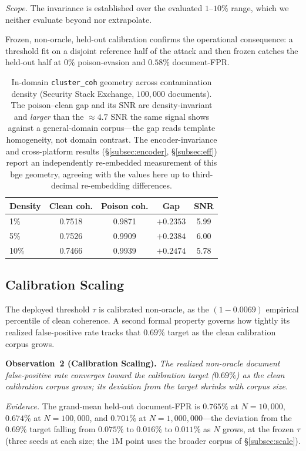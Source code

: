 \documentclass[conference]{IEEEtran}
\begin{document}
\emph{Scope.} The invariance is established over the evaluated $1$--$10\%$ range,
which we neither evaluate beyond nor extrapolate.

Frozen, non-oracle, held-out calibration confirms the operational consequence: a
threshold fit on a disjoint reference half of the attack and then frozen catches the
held-out half at $0\%$ poison-evasion and $0.58\%$ document-FPR.

\begin{table}[t]
\centering
\caption{In-domain \texttt{cluster\_coh} geometry across contamination density
(Security Stack Exchange, $100{,}000$ documents). The poison--clean gap and its
SNR are density-invariant and \emph{larger} than the $\approx\!4.7$ SNR the same
signal shows against a general-domain corpus---the gap reads template homogeneity,
not domain contrast. The encoder-invariance and cross-platform results
(\S\ref{subsec:encoder}, \S\ref{subsec:eff}) report an independently re-embedded measurement of
this bge geometry, agreeing with the values here up to third-decimal re-embedding differences.}
\label{tab:coh}
\begin{tabular}{lcccc}
\toprule
Density & Clean coh. & Poison coh. & Gap & SNR \\
\midrule
1\%  & 0.7518 & 0.9871 & $+0.2353$ & 5.99 \\
5\%  & 0.7526 & 0.9909 & $+0.2384$ & 6.00 \\
10\% & 0.7466 & 0.9939 & $+0.2474$ & 5.78 \\
\bottomrule
\end{tabular}
\end{table}

\subsection{Calibration Scaling}
\label{subsec:calib}
The deployed threshold $\tau$ is calibrated non-oracle, as the $(1-0.0069)$
empirical percentile of clean coherence. A second formal property governs how
tightly its realized false-positive rate tracks that $0.69\%$ target as the clean
calibration corpus grows.

\smallskip
\noindent\textbf{Observation~2 (Calibration Scaling).}
\emph{The realized non-oracle document false-positive rate converges toward the
calibration target ($0.69\%$) as the clean calibration corpus grows; its deviation
from the target shrinks with corpus size.}

\emph{Evidence.} The grand-mean held-out document-FPR is $0.765\%$ at $N=10{,}000$,
$0.674\%$ at $N=100{,}000$, and $0.701\%$ at $N=1{,}000{,}000$---the deviation from the
$0.69\%$ target falling from $0.075\%$ to $0.016\%$ to $0.011\%$ as $N$ grows, at the
frozen $\tau$ (three seeds at each size; the $1$M point uses the broader corpus of
\S\ref{subsec:scale}).
\end{document}
